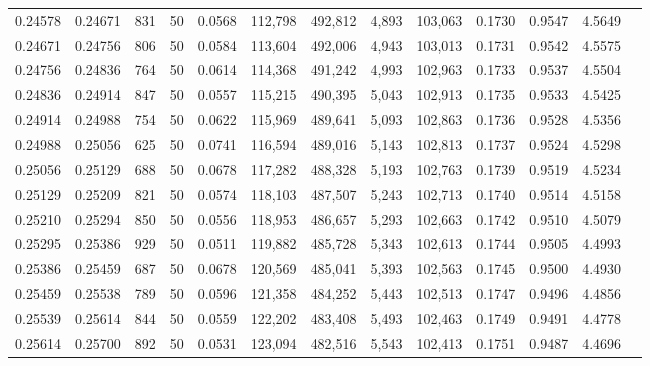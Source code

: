 \begin{tabular}{rrrrrrrrrrrrr}
0.24578 & 0.24671 &   831 &  50 &                                     0.0568 & 112,798 & 492,812 &   4,893 & 103,063 & 0.1730 & 0.9547 & 4.5649 \\
0.24671 & 0.24756 &   806 &  50 &                                     0.0584 & 113,604 & 492,006 &   4,943 & 103,013 & 0.1731 & 0.9542 & 4.5575 \\
0.24756 & 0.24836 &   764 &  50 &                                     0.0614 & 114,368 & 491,242 &   4,993 & 102,963 & 0.1733 & 0.9537 & 4.5504 \\
0.24836 & 0.24914 &   847 &  50 &                                     0.0557 & 115,215 & 490,395 &   5,043 & 102,913 & 0.1735 & 0.9533 & 4.5425 \\
0.24914 & 0.24988 &   754 &  50 &                                     0.0622 & 115,969 & 489,641 &   5,093 & 102,863 & 0.1736 & 0.9528 & 4.5356 \\
0.24988 & 0.25056 &   625 &  50 &                                     0.0741 & 116,594 & 489,016 &   5,143 & 102,813 & 0.1737 & 0.9524 & 4.5298 \\
0.25056 & 0.25129 &   688 &  50 &                                     0.0678 & 117,282 & 488,328 &   5,193 & 102,763 & 0.1739 & 0.9519 & 4.5234 \\
0.25129 & 0.25209 &   821 &  50 &                                     0.0574 & 118,103 & 487,507 &   5,243 & 102,713 & 0.1740 & 0.9514 & 4.5158 \\
0.25210 & 0.25294 &   850 &  50 &                                     0.0556 & 118,953 & 486,657 &   5,293 & 102,663 & 0.1742 & 0.9510 & 4.5079 \\
0.25295 & 0.25386 &   929 &  50 &                                     0.0511 & 119,882 & 485,728 &   5,343 & 102,613 & 0.1744 & 0.9505 & 4.4993 \\
0.25386 & 0.25459 &   687 &  50 &                                     0.0678 & 120,569 & 485,041 &   5,393 & 102,563 & 0.1745 & 0.9500 & 4.4930 \\
0.25459 & 0.25538 &   789 &  50 &                                     0.0596 & 121,358 & 484,252 &   5,443 & 102,513 & 0.1747 & 0.9496 & 4.4856 \\
0.25539 & 0.25614 &   844 &  50 &                                     0.0559 & 122,202 & 483,408 &   5,493 & 102,463 & 0.1749 & 0.9491 & 4.4778 \\
0.25614 & 0.25700 &   892 &  50 &                                     0.0531 & 123,094 & 482,516 &   5,543 & 102,413 & 0.1751 & 0.9487 & 4.4696 \\

\end{tabular}

